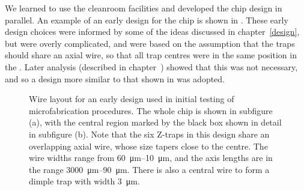 We learned to use the cleanroom facilities and developed the chip design in
parallel. An example of an early design for the chip is shown in
. These early design choices were informed by
some of the ideas discussed in chapter~\ref{design}, but were overly
complicated, and were based on the assumption that the traps should share an
axial wire, so that all trap centres were in the same position in the
\xyplane{}. Later analysis (described in chapter~) showed
that this was not necessary, and so a design more similar to that shown in
 was adopted.

\begin{figure}[ht]
  \begin{subfigure}[b]{0.45\textwidth}
    \centering
    \caption{}
  \end{subfigure}
  \hspace{1cm}
  \begin{subfigure}[b]{0.45\textwidth}
    \centering
    \caption{}
  \end{subfigure}
  \caption[Prototype chip layout]{
    Wire layout for an early design used in initial testing of
  microfabrication procedures. The whole chip is shown in subfigure (a), with
  the central region marked by the black box shown in detail in subfigure (b).
  Note that the six Z-traps in this design share an overlapping axial wire,
  whose size tapers close to the centre. The wire widths range from
  \SIrange{60}{10}{\micro\meter}, and the axis lengths are in the range
  \SIrange{3000}{90}{\micro\meter}. There is also a central wire to form a
  dimple trap with width \SI{3}{\micro\meter}.
  }
  \label{fab:figs:earlydesign}
\end{figure}


